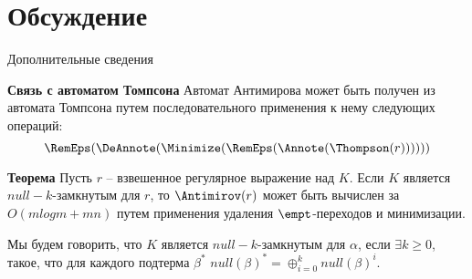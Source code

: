 \section{Обсуждение}
\begin{frame}{Дополнительные сведения}
    \begin{block}{\bf Связь с автоматом Томпсона}
        Автомат Антимирова может быть получен из автомата Томпсона путем последовательного применения к нему следующих операций:
        \[\RemEps(\DeAnnote(\Minimize(\RemEps(\Annote(\Thompson(r))))))\] %
    \end{block}
    \begin{block}{\bf Теорема}
        Пусть $r$ -- взвешенное регулярное выражение над $K$. Если $K$ является $null-k$-замкнутым для $r$, то $\Antimirov(r)$ может быть вычислен за $O(m log m + mn)$ путем применения удаления $\empt$-переходов и минимизации.
    \end{block}
    Мы будем говорить, что $K$ является $null-k$-замкнутым для $\alpha$, если $\exists k \geq 0$, такое, что для каждого подтерма $\beta^*$ $null(\beta)^* = \oplus_{i=0}^{k} null(\beta)^i$.
\end{frame}